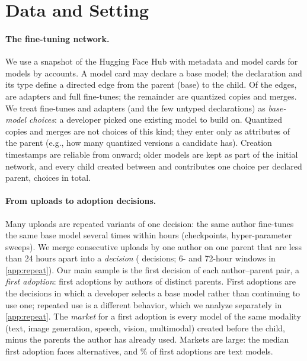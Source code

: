 \section{Data and Setting}
\label{sec:data}

\paragraph{The fine-tuning network.}
We use a snapshot of the Hugging Face Hub with metadata and model cards for \nModels{} models by \nAuthorsAll{}
accounts. A model card may declare a base model; the declaration and
its type define a directed edge from the parent (base) to the child. Of the \nEdges{} edges, \nAdapter{} are
adapters and \nFinetune{} full fine-tunes; the remainder are quantized copies and merges. We treat fine-tunes and
adapters (and the few untyped declarations) as \emph{base-model choices}: a developer picked one existing model to
build on. Quantized copies and merges are not choices of this kind; they enter only as attributes of the parent
(e.g., how many quantized versions a candidate has). Creation timestamps are reliable from \tStart{} onward; older
models are kept as part of the initial network, and every child created between \tStart{} and \tEnd{} contributes
one choice per declared parent, \nChoices{} choices in total.

\paragraph{From uploads to adoption decisions.}
Many uploads are repeated variants of one decision: the same author fine-tunes the same base model several times
within hours (checkpoints, hyper-parameter sweeps). We merge consecutive uploads by one author on one parent that
are less than 24 hours apart into a \emph{decision} (\nDecisions{} decisions; 6- and 72-hour windows in
\cref{app:repeat}). Our main sample is the first decision of each author--parent pair, a \emph{first adoption}:
\nFirst{} first adoptions by \nFirstAuthors{} authors of \nFirstParents{} distinct parents. First adoptions are the
decisions in which a developer selects a base model rather than continuing to use one; repeated use is a different
behavior, which we analyze separately in \cref{app:repeat}. The \emph{market} for a first adoption is every model of
the same modality (text, image generation, speech, vision, multimodal) created before the child, minus the parents
the author has already used. Markets are large: the median first adoption faces \marketMedian{} alternatives, and
\shareText\% of first adoptions are text models.

